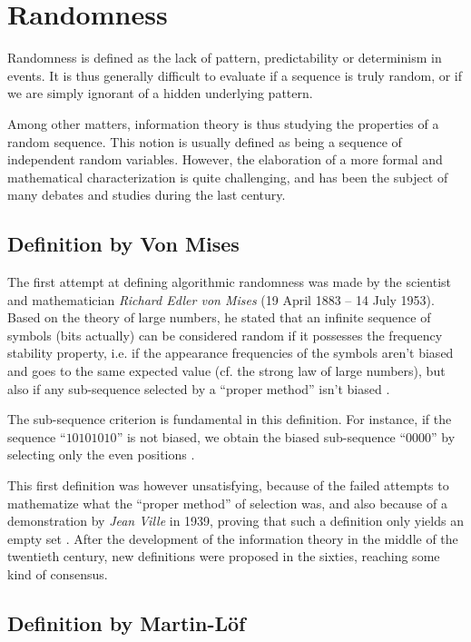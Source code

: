 \documentclass{llncs}
\begin{document}
\section{Randomness}
\label{sec:rand}


Randomness is defined as the lack of pattern, predictability or determinism in events. It is thus generally difficult to evaluate if a sequence is truly random, or if we are simply ignorant of a hidden underlying pattern.

Among other matters, information theory is thus studying the properties of a random sequence. This notion is usually defined as being a sequence of independent random variables. However, the elaboration of a more formal and mathematical characterization is quite challenging, and has been the subject of many debates and studies during the last century.

\subsection{Definition by Von Mises}


The first attempt at defining algorithmic randomness was made by the scientist and mathematician \emph{Richard Edler von Mises} (19 April 1883 – 14 July 1953). Based on the theory of large numbers, he stated that an infinite sequence of symbols (bits actually) can be considered random if it possesses the frequency stability property, i.e. if the appearance frequencies of the symbols aren't biased and goes to the same expected value (cf. the strong law of large numbers), but also if any sub-sequence selected by a ``proper method'' isn't biased \cite{down}.

The sub-sequence criterion is fundamental in this definition. For instance, if the sequence “$10101010$” is not biased, we obtain the biased sub-sequence “$0000$” by selecting only the even positions \cite{down}.

This first definition was however unsatisfying, because of the failed attempts to mathematize what the “proper method” of selection was, and also because of a demonstration by \emph{Jean Ville} in 1939, proving that such a definition only yields an empty set \cite{down}. After the development of the information theory in the middle of the twentieth century, new definitions were proposed in the sixties, reaching some kind of consensus.

\subsection{Definition by Martin-L\"{o}f}
\end{document}
